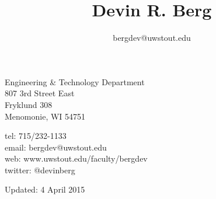 \documentclass[10pt]{article}
\title{\bfseries\Huge Devin R. Berg}
\author{bergdev@uwstout.edu}
\date{}
\begin{document}
\maketitle
\vspace{1em}
\begin{minipage}[ht]{0.48\textwidth}
Engineering \& Technology Department\\
807 3rd Street East\\
Fryklund 308\\
Menomonie, WI 54751
\end{minipage}
\begin{minipage}[ht]{0.48\textwidth}
\begin{flushright}
tel: 715/232-1133\\
email: bergdev@uwstout.edu\\
web: www.uwstout.edu/faculty/bergdev\\
twitter: @devinberg
\end{flushright}
\end{minipage}
\vspace{20pt}




















































\vspace{20pt}
\vspace{20pt}
\scriptsize\hfill Updated: 4 April 2015
\end{document}
